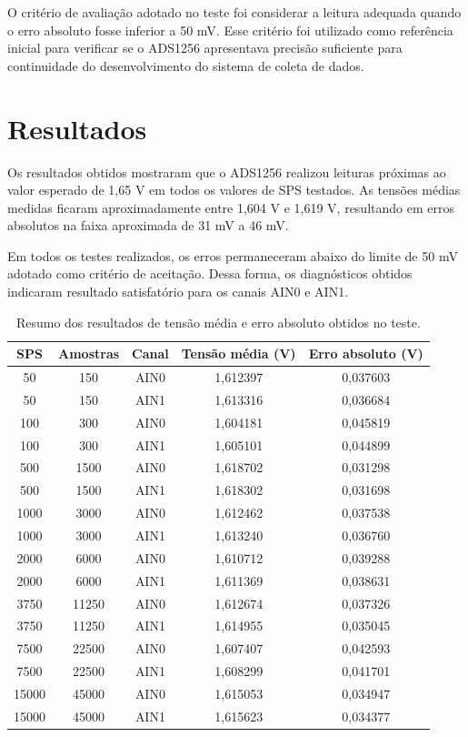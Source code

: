 \documentclass[12pt, a4paper]{article}
\begin{document}
O critério de avaliação adotado no teste foi considerar a leitura adequada quando o erro absoluto fosse inferior a 50 mV. 
Esse critério foi utilizado como referência inicial para verificar se o ADS1256 apresentava precisão suficiente para continuidade do desenvolvimento do sistema de coleta de dados.

\section{Resultados}

Os resultados obtidos mostraram que o ADS1256 realizou leituras próximas ao valor esperado de 1,65 V em todos os valores de SPS testados. 
As tensões médias medidas ficaram aproximadamente entre 1,604 V e 1,619 V, resultando em erros absolutos na faixa aproximada de 31 mV a 46 mV.

Em todos os testes realizados, os erros permaneceram abaixo do limite de 50 mV adotado como critério de aceitação. 
Dessa forma, os diagnósticos obtidos indicaram resultado satisfatório para os canais AIN0 e AIN1.

\begin{table}[H]
    \centering
    \caption{Resumo dos resultados de tensão média e erro absoluto obtidos no teste.}
    \label{tab:resultados}
    \begin{tabular}{ccccc}
        \toprule
        SPS & Amostras & Canal & Tensão média (V) & Erro absoluto (V) \\
        \midrule
        50    & 150   & AIN0 & 1,612397 & 0,037603 \\
        50    & 150   & AIN1 & 1,613316 & 0,036684 \\
        100   & 300   & AIN0 & 1,604181 & 0,045819 \\
        100   & 300   & AIN1 & 1,605101 & 0,044899 \\
        500   & 1500  & AIN0 & 1,618702 & 0,031298 \\
        500   & 1500  & AIN1 & 1,618302 & 0,031698 \\
        1000  & 3000  & AIN0 & 1,612462 & 0,037538 \\
        1000  & 3000  & AIN1 & 1,613240 & 0,036760 \\
        2000  & 6000  & AIN0 & 1,610712 & 0,039288 \\
        2000  & 6000  & AIN1 & 1,611369 & 0,038631 \\
        3750  & 11250 & AIN0 & 1,612674 & 0,037326 \\
        3750  & 11250 & AIN1 & 1,614955 & 0,035045 \\
        7500  & 22500 & AIN0 & 1,607407 & 0,042593 \\
        7500  & 22500 & AIN1 & 1,608299 & 0,041701 \\
        15000 & 45000 & AIN0 & 1,615053 & 0,034947 \\
        15000 & 45000 & AIN1 & 1,615623 & 0,034377 \\
        \bottomrule
    \end{tabular}
\end{table}
\end{document}
